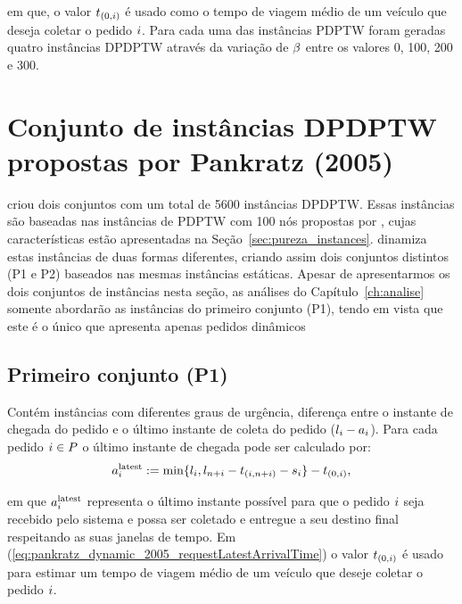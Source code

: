
\noindent em que, o valor $t_{(0,i)}$ é usado como o tempo 
de viagem médio de um veículo que deseja coletar o pedido $i$.
Para cada uma das instâncias PDPTW foram geradas quatro instâncias DPDPTW 
através da variação de $\beta$ entre os valores 0, 100, 200 e 300.






\section{Conjunto de instâncias DPDPTW propostas por Pankratz (2005)}

\textcite{pankratz_dynamic_2005} criou dois conjuntos com um total de 5600 
instâncias DPDPTW.
Essas instâncias são baseadas nas instâncias de PDPTW com 100 nós propostas por
\textcite{li_metaheuristic_2003}, cujas características estão apresentadas 
na Seção~\ref{sec:pureza_instances}.
\textcite{pankratz_dynamic_2005} dinamiza estas instâncias de duas formas 
diferentes, criando assim dois conjuntos distintos (P1 e P2) baseados 
nas mesmas instâncias estáticas.
Apesar de apresentarmos os dois conjuntos de instâncias nesta seção, as 
análises do Capítulo~\ref{ch:analise} somente abordarão as instâncias do 
primeiro conjunto (P1), tendo em vista que este é o único que apresenta apenas
pedidos dinâmicos

\subsection{Primeiro conjunto (P1)}
Contém instâncias com diferentes graus de urgência, diferença entre o instante 
de chegada do pedido  e o último instante de coleta do
pedido ($l_i - a_i$). 
Para cada pedido $i \in P$ o último instante de chegada 
pode ser calculado por: 
%
\begin{equation}
  a{}_{i{}}^{\mathrm{latest}} := 
  \min\{l_i, l_{n + i} 
  - t_{(i,n + i)} 
  - s_i\} - t_{(0,i)},
  \label{eq:pankratz_dynamic_2005_requestLatestArrivalTime}
\end{equation}

\noindent em que $a{}_{i{}}^{\mathrm{latest}}$ representa o último instante 
possível para que o pedido $i$ seja recebido pelo sistema e possa ser 
coletado e entregue a seu destino final respeitando as suas janelas de tempo.
Em (\ref{eq:pankratz_dynamic_2005_requestLatestArrivalTime}) o valor
$t_{(0,i)}$ é usado para estimar um tempo de 
viagem médio de um veículo que deseje coletar o pedido $i$.

